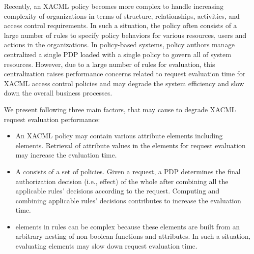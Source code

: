 Recently, an XACML policy becomes more complex to handle increasing complexity of organizations in terms of structure, relationships, activities, and access control requirements. In such a situation, the policy often consists of a large number of rules to specify policy behaviors for various resources, users and actions in the organizations.
In policy-based systems, policy authors manage centralized a single PDP loaded with a single policy to govern all of system resources. 
However, due to a large number of rules for evaluation, this centralization raises performance concerns related to request evaluation time for XACML access control policies and may 
degrade the system efficiency and slow down the overall business processes. 

We present following three main factors, that may cause to degrade XACML request evaluation performance: 

\begin{itemize}
\item An XACML policy may contain various attribute elements including  elements. Retrieval of
attribute values in the  elements for request evaluation may increase the evaluation time.
\item A  consists of a set of policies. Given a request, a PDP determines the final authorization decision (i.e., effect) of the whole  after combining all the applicable rules' decisions according to the request.
Computing and combining applicable rules' decisions contributes to increase the evaluation time.
\item {} elements in rules can be complex because these elements are built from an arbitrary nesting of non-boolean functions and attributes. 
In such a situation, evaluating  elements may slow down request evaluation time.
\end{itemize}

